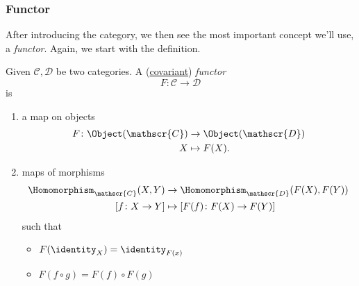 \subsubsection{Functor}
After introducing the category, we then see the most important concept we'll use, a \emph{functor}. Again, we start with the definition.
\begin{definition}[Functor]\label{def:functor}
	Given \(\mathscr{C} , \mathscr{D} \) be two categories. A (\underline{covariant}) \emph{functor}
	\[
		F\colon \mathscr{C} \to \mathscr{D}
	\]
	is
	\begin{enumerate}
		\item a map on objects
		      \[
			      \begin{split}
				      F\colon \Object(\mathscr{C} )&\to \Object(\mathscr{D} )\\
				      X&\mapsto F(X).
			      \end{split}
		      \]
		\item maps of morphisms
		      \[
			      \begin{split}
				      \Homomorphism_{\mathscr{C} }(X, Y)&\to \Homomorphism_{\mathscr{D} }(F(X), F(Y))\\
				      \left[f\colon X\to Y\right] &\mapsto \left[F(f)\colon F(X)\to F(Y)\right]
			      \end{split}
		      \]
		      such that
		      \begin{itemize}
			      \item \(F(\identity_{X} ) = \identity_{F(x)} \)
			      \item \(F(f\circ g) = F(f)\circ F(g)\)
		      \end{itemize}
	\end{enumerate}
\end{definition}